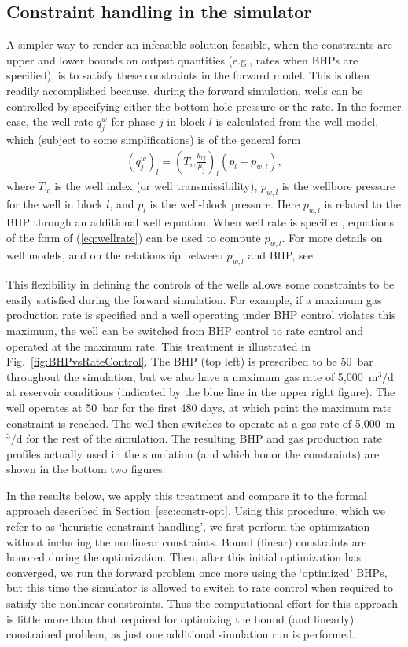 \documentclass[twocolumn,numbook]{svjour3}          %
\begin{document}
\subsection{Constraint handling in the simulator}  \label{sec:constr-sim}

A simpler way to render an infeasible solution feasible, when the
constraints are upper and lower bounds on output quantities 
(e.g., rates when BHPs are specified), is to satisfy these constraints 
in the forward model. This is often readily accomplished because, during the forward
simulation, wells can be controlled by specifying either the bottom-hole 
pressure or the rate. In the former case,
the well rate $q_j^w$ for phase $j$ in block $l$ is calculated from the well model, which (subject to some simplifications) is of the general form
%
\begin{align}
\label{eq:wellrate}
  \left( q_j^w \right)_l = \left( T_w\frac{k_{rj}}{\mu_j} \right)_l (p_l - p_{w,l}),
\end{align}
%
where $T_w$ is the well index (or well transmissibility), $p_{w,l}$ is the 
wellbore pressure for the well in block $l$, and $p_l$ is the well-block pressure.
Here $p_{w,l}$ is related to the BHP through an additional well equation. 
When well rate is specified, equations of the form of (\ref{eq:wellrate}) 
can be used to compute $p_{w,l}$. For more details on well models, and on the 
relationship between $p_{w,l}$ and BHP, see \cite{Cao:Thesis}.
%


This flexibility in defining the controls of the wells allows some constraints
to be easily satisfied during the forward simulation. For example, if a maximum
gas production rate is specified and a well operating under BHP control violates
this maximum, the well can be switched from BHP control to rate control and
operated at the maximum rate. This treatment is illustrated in
Fig.~\ref{fig:BHPvsRateControl}. The BHP (top left) is prescribed to be 50~bar
throughout the simulation, but we also have a maximum gas rate of 5,000~m$^3/$d at reservoir conditions (indicated by the blue line in the upper right figure). The well operates at
50~bar for the first 480 days, at which point the maximum rate constraint is
reached. The well then switches to operate at a gas rate of 5,000~m$^3/$d for the
rest of the simulation. The resulting BHP and gas production rate profiles
actually used in the simulation (and which honor the constraints) are shown in
the bottom two figures.

In the results below, we apply this treatment and compare it to the formal approach described in Section~\ref{sec:constr-opt}. Using this procedure, which we refer to as `heuristic constraint handling', we first perform the optimization without including the nonlinear constraints. Bound (linear) constraints are honored during the optimization. Then, after this initial optimization has converged, we run the forward problem once more using the `optimized' BHPs, but this time the simulator is allowed to switch to rate control when required to satisfy the nonlinear constraints. Thus the computational effort for this approach is little more than that required for optimizing the bound (and linearly) constrained problem, as just one additional simulation run is performed.
\end{document}
